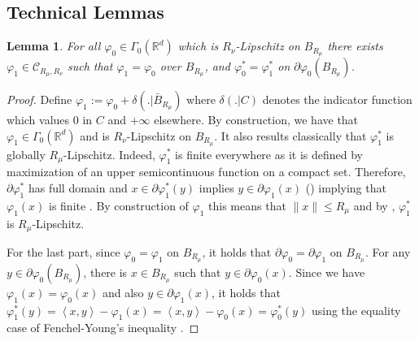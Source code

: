 \documentclass[11pt]{article}
\newtheorem{lemma}{Lemma}[section]
\newcommand{\blue}[1]{{\color{blue} #1}}
\newcommand{\R}{\mathbb R}
\newcommand{\1}{\mathbbm{1}}
\numberwithin{equation}{section}
\begin{document}
\subsection{Technical Lemmas}
\begin{lemma}
    For all $\varphi_0\in \Gamma_0(\R^d)$ which is $R_\nu$-Lipschitz on $B_{R_\mu}$ there exists $\varphi_1\in \mathcal{C}_{R_\mu,R_\nu}$ such that $\varphi_1=\varphi_0$ over $B_{R_\mu}$, and  $\varphi^*_0 = \varphi^*_1$ on $\partial \varphi_0 (B_{R_\mu})$.
    \label{lem:identification_lipschitz}
\end{lemma}
\begin{proof} 
    Define $\varphi_1:=\varphi_0+\delta(.|\bar{B}_{R_\mu})$ where $\delta(.|C)$ denotes the  indicator function which values $0$ in $C$ and $+\infty$ elsewhere. By construction, we have that $\varphi_1\in \Gamma_0(\R^d)$ and is $R_\nu$-Lipschitz on $B_{R_\mu}$.  
    It also results classically that $\varphi_1^*$ is globally $R_\mu$-Lipschitz. 
    Indeed, $\varphi_1^*$ is finite everywhere as it is defined by maximization of an upper semicontinuous function on a compact set. Therefore, $\partial \varphi_1^*$ has full domain and $x\in \partial\varphi_1^*(y)$ implies $y \in \partial \varphi_1(x)$ (\cite[Theorem 23.5]{rockafellar1970convex}) implying that $\varphi_1(x)$ is finite . By construction of $\varphi_1$ this means that $\|x\|\leq R_{\mu}$ and by \cite[Theorem 24.7]{rockafellar1970convex}, $\varphi_1^*$ is $R_\mu$-Lipschitz. 
    
    
    For the last part, since $\varphi_0 = \varphi_1$ on $B_{R_\mu}$, it holds that $ \partial \varphi_0 = \partial \varphi_1$ on $B_{R_\mu}$. For any $y \in \partial \varphi_0(B_{R_\mu})$, there is $x \in B_{R_\mu}$ such that $y \in \partial \varphi_0(x)$. Since we have $\varphi_1(x) = \varphi_0(x)$ and also $y \in \partial \varphi_1(x)$, it holds that $\varphi_1^*(y) = \left\langle x, y\right\rangle - \varphi_1(x) = \left\langle x, y\right\rangle - \varphi_0(x) = \varphi_0^*(y)$ using the equality case of Fenchel-Young's inequality \cite[Theorem 23.5]{rockafellar1970convex}.
\end{proof}
\end{document}
